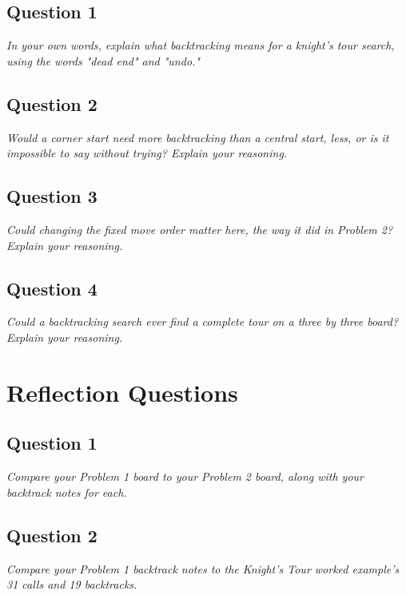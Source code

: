 \documentclass[11pt]{article}
\begin{document}
\subsection{Question 1}
\textit{In your own words, explain what backtracking means for a knight's
tour search, using the words "dead end" and "undo."}

\vspace{2em}

\subsection{Question 2}
\textit{Would a corner start need more backtracking than a central start,
less, or is it impossible to say without trying? Explain your reasoning.}

\vspace{2em}

\subsection{Question 3}
\textit{Could changing the fixed move order matter here, the way it did in
Problem 2? Explain your reasoning.}

\vspace{2em}

\subsection{Question 4}
\textit{Could a backtracking search ever find a complete tour on a three by
three board? Explain your reasoning.}

\vspace{2em}

\section{Reflection Questions}

\subsection{Question 1}
\textit{Compare your Problem 1 board to your Problem 2 board, along with
your backtrack notes for each.}

\vspace{2em}

\subsection{Question 2}
\textit{Compare your Problem 1 backtrack notes to the Knight's Tour worked
example's 31 calls and 19 backtracks.}
\end{document}
